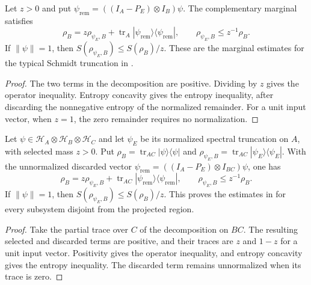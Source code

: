 \begin{theorem}
\label{thm:entropy_typical_complementary_marginal}
\leanok
{}
Let $z>0$ and put $\psi_{\mathrm{rem}}=((I_A-P_E)\otimes I_B)\psi$.
The complementary marginal satisfies
\[
 \rho_B=z\rho_{\psi_E,B}
   +\operatorname{tr}_A|\psi_{\mathrm{rem}}\rangle\langle\psi_{\mathrm{rem}}|,
 \qquad \rho_{\psi_E,B}\le z^{-1}\rho_B.
\]
If $\|\psi\|=1$, then $S(\rho_{\psi_E,B})\le S(\rho_B)/z$.
These are the marginal estimates for the typical Schmidt truncation
in \cite[Section~8]{OpenAI2026AreaLaw}.
\end{theorem}
\begin{proof}
\leanok
The two terms in the decomposition are positive. Dividing by $z$ gives the
operator inequality. Entropy concavity gives the entropy inequality, after
discarding the nonnegative entropy of the normalized remainder.
For a unit input vector, when $z=1$, the zero remainder requires no normalization.
\end{proof}


\begin{theorem}
\label{thm:entropy_typical_complementary_subsystem}
\leanok
{}
Let $\psi\in\mathcal H_A\otimes\mathcal H_B\otimes\mathcal H_C$ and let
$\psi_E$ be its normalized spectral truncation on $A$, with selected mass $z>0$.
Put $\rho_B=\operatorname{tr}_{AC}|\psi\rangle\langle\psi|$ and
$\rho_{\psi_E,B}=\operatorname{tr}_{AC}|\psi_E\rangle\langle\psi_E|$.
With the unnormalized discarded vector
$\psi_{\mathrm{rem}}=((I_A-P_E)\otimes I_{BC})\psi$, one has
\[
 \rho_B=z\rho_{\psi_E,B}
   +\operatorname{tr}_{AC}|\psi_{\mathrm{rem}}\rangle\langle\psi_{\mathrm{rem}}|,
 \qquad \rho_{\psi_E,B}\le z^{-1}\rho_B.
\]
If $\|\psi\|=1$, then $S(\rho_{\psi_E,B})\le S(\rho_B)/z$.
This proves the estimates in \cite[Section~8]{OpenAI2026AreaLaw}
for every subsystem disjoint from the projected region.
\end{theorem}
\begin{proof}
\leanok
Take the partial trace over $C$ of the decomposition on $BC$.
The resulting selected and discarded terms are positive, and their traces
are $z$ and $1-z$ for a unit input vector. Positivity gives the operator
inequality, and entropy concavity gives the entropy inequality.
The discarded term remains unnormalized when its trace is zero.
\end{proof}
